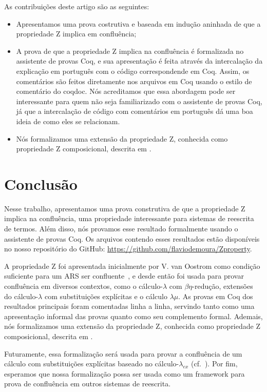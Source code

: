 \documentclass{entcs}
\begin{document}
As contribuições deste artigo são as seguintes:
\begin{itemize}
\item Apresentamos uma prova costrutiva e baseada em indução aninhada 
de que a propriedade Z implica em confluência;
\item A prova de que a propriedade Z implica na confluência é formalizada no 
assistente de provas Coq, e sua apresentação é feita através da intercalação 
da explicação em português com o código correspondende em Coq. Assim, 
os comentários são feitos diretamente nos arquivos em Coq usando o 
estilo de comentário do coqdoc. Nós acreditamos que essa abordagem pode 
ser interessante para quem não seja familiarizado com o assistente de provas Coq, 
já que a intercalação de código com comentários em português dá uma boa ideia 
de como eles se relacionam.
\item Nós formalizamos uma extensão da propriedade Z, conhecida como propriedade 
Z composicional, descrita em \cite{Nakazawa-Fujita2016}.
\end{itemize}




\section{Conclusão}

Nesse trabalho, apresentamos uma prova construtiva de que a 
propriedade Z implica na confluência, uma propriedade interessante 
para sistemas de reescrita de termos. Além disso, nós provamos 
esse resultado formalmente usando o assistente de provas Coq. 
Os arquivos contendo esses resultados estão disponíveis no nosso 
repositório do GitHub: \url{https://github.com/flaviodemoura/Zproperty}.

A propriedade Z foi apresentada inicialmente por V. van Oostrom como 
condição suficiente para um ARS ser confluente~\cite{zproperty}, e desde então foi usada 
para provar confluência em diversos contextos, como o cálculo-$\lambda$ com 
$\beta\eta$-redução, extensões do cálculo-$\lambda$ com substituições explícitas e 
o cálculo $\lambda\mu$. As provas em Coq dos resultados principais foram 
comentadas linha a linha, servindo tanto como uma apresentação informal das provas 
quanto como seu complemento formal. Ademais, nós formalizamos uma extensão da 
propriedade Z, conhecida como propriedade Z composicional, descrita em 
\cite{Nakazawa-Fujita2016}.

Futuramente, essa formalização será usada para provar a confluência de um 
cálculo com substituições explícitas baseado no cálculo-$\lambda_{ex}$ (cf.~\cite{kes09}). 
Por fim, esperamos que nossa formalização possa ser usada como um framework 
para prova de confluência em outros sistemas de reescrita.



\end{document}
